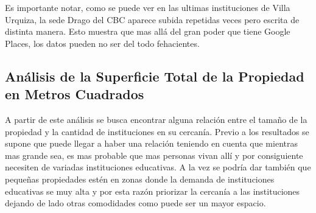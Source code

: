 \documentclass[a4paper, 10pt]{article}
\begin{document}
					Es importante notar, como se puede ver en las ultimas instituciones de 
					Villa Urquiza, la sede Drago del CBC aparece subida repetidas veces 
					pero escrita de distinta manera. Esto muestra que mas allá del gran 
					poder que tiene Google Places, los datos pueden no ser del todo fehacientes.
					
		\subsection{Análisis de la Superficie Total de la Propiedad en Metros Cuadrados} 
			A partir de este análisis se busca encontrar alguna relación entre el tamaño de la propiedad 
		y la cantidad de instituciones en su cercanía. Previo a los resultados se supone que puede 
		llegar a haber una relación teniendo en cuenta que mientras mas grande sea, es mas probable 
		que mas personas vivan allí y por consiguiente necesiten de variadas instituciones educativas. 
		A la vez se podría dar también que pequeñas propiedades estén en zonas donde la demanda de 
		instituciones educativas se muy alta y por esta razón priorizar la cercanía a las instituciones 
		dejando de lado otras comodidades como puede ser un mayor espacio.			
		
\end{document}
